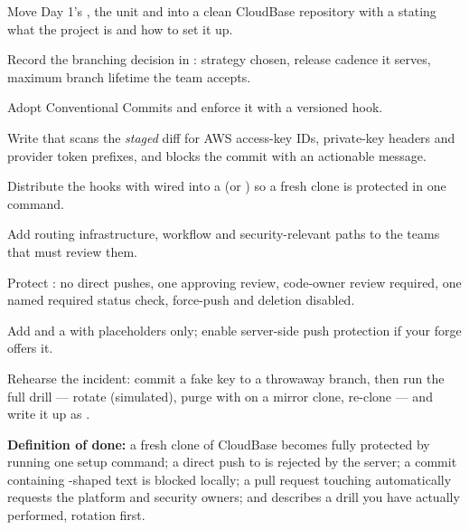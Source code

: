 \begin{buildalong}
\begin{wbitem}
  \item Move Day 1's , the  unit and  into a clean CloudBase repository with a  stating what the project is and how to set it up.
  \item Record the branching decision in : strategy chosen, release cadence it serves, maximum branch lifetime the team accepts.
  \item Adopt Conventional Commits and enforce it with a versioned  hook.
  \item Write  that scans the \emph{staged} diff for AWS access-key IDs, private-key headers and provider token prefixes, and blocks the commit with an actionable message.
  \item Distribute the hooks with  wired into a  (or ) so a fresh clone is protected in one command.
  \item Add  routing infrastructure, workflow and security-relevant paths to the teams that must review them.
  \item Protect : no direct pushes, one approving review, code-owner review required, one named required status check, force-push and deletion disabled.
  \item Add  and a  with placeholders only; enable server-side push protection if your forge offers it.
  \item Rehearse the incident: commit a fake key to a throwaway branch, then run the full drill --- rotate (simulated), purge with  on a mirror clone, re-clone --- and write it up as .
\end{wbitem}
\smallskip\textbf{Definition of done:} a fresh clone of CloudBase becomes fully protected by running one setup command; a direct push to  is rejected by the server; a commit containing -shaped text is blocked locally; a pull request touching  automatically requests the platform and security owners; and  describes a drill you have actually performed, rotation first.
\end{buildalong}

